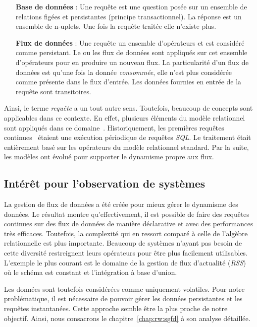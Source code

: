 \begin{itemize}
    \item[\textbf{Base de données}] : Une requête est une question posée sur un ensemble de relations figées et persistantes (principe transactionnel). La réponse est un ensemble de n-uplets. Une fois la requête traitée elle n'existe plus.
    \item[\textbf{Flux de données}] : Une requête un ensemble d'opérateurs et est considéré comme persistant. Le ou les flux de données sont appliqués sur cet ensemble d'opérateurs pour en produire un nouveau flux. La particularité d'un flux de données est qu'une fois la donnée \textit{consommée}, elle n'est plus considérée comme présente dans le flux d'entrée. Les données fournies en entrée de la requête sont  transitoires.
\end{itemize}

Ainsi, le terme \textit{requête} a un tout autre sens. Toutefois, beaucoup de concepts sont applicables dans ce contexte. En effet, plusieurs éléments du modèle relationnel sont appliqués dans ce domaine~\cite{Arasu:semantic}. Historiquement, les premières requêtes continues~\cite{Terry:tapestry} étaient une exécution périodique de requêtes \textit{SQL}. Le traitement était entièrement basé sur les opérateurs du modèle relationnel standard. Par la suite, les modèles ont évolué pour supporter le dynamisme propre aux flux.

\subsection{Intérêt pour l'observation de systèmes}
La gestion de flux de données a été créée pour mieux gérer le dynamisme des données. Le résultat montre qu'effectivement, il est possible de faire des requêtes continues sur des flux de données de manière déclarative et avec des performances très efficaces. Toutefois, la complexité qui en ressort comparé à celle de l'algèbre relationnelle est plus importante. Beaucoup de systèmes n'ayant pas besoin de cette diversité restreignent leurs opérateurs pour être plus facilement utilisables. L'exemple le plus courant est le domaine de la gestion de flux d'actualité (\textit{RSS}) où le schéma est constant et l'intégration à base d'union.

Les données sont toutefois considérées comme uniquement volatiles. Pour notre problématique, il est nécessaire de pouvoir gérer les données persistantes et les requêtes instantanées. Cette approche semble être la plus proche de notre objectif. Ainsi, nous consacrons le chapitre~\ref{chap:rw:sgfd} à son analyse détaillée.

